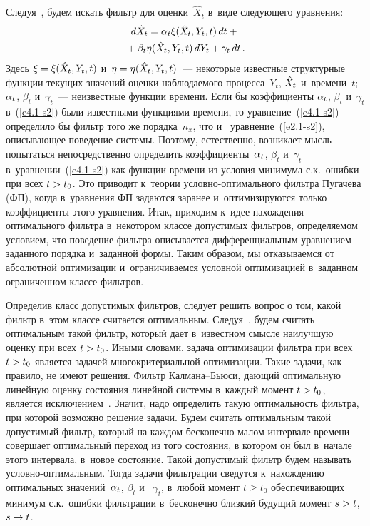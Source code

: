 \begin{multicols}{2}
Следуя~\cite{3-s2, 1-s2}, будем искать фильтр для оценки~$\hat X_t$ в~виде 
следующего уравнения:
 \begin{multline}
 d\hat X_t =\alpha_t \xi ({\hat X}_t,Y_t, t)\, dt + {}\\
 {}+\beta_t\eta ({\hat X}_t,Y_t, t)\, dY_t +
    \gamma_t \,dt\,.
    \label{e4.1-s2}
    \end{multline}
Здесь  $\xi =\xi ({\hat X}_t,Y_t, t)$ и~$\eta\hm=\eta\yhxt$~--- некоторые известные 
структурные функции
текущих значений оценки наблюдаемого процесса~$Y_t$, $\hat X_t$ и~времени~$t$; 
$\alpha_t$, $\beta_t$ и~$\gamma_t$~--- неизвестные функции времени.
Если бы коэффициенты  $\alpha_t$, $\beta_t$ и~$\gamma_t$ в~(\ref{e4.1-s2})
были известными функциями времени, то уравнение~(\ref{e4.1-s2}) определило
бы фильтр того же  порядка~${n_x}$, что и~ уравнение~(\ref{e2.1-s2}), 
описывающее поведение системы. Поэтому, естественно,
возникает мысль попытаться непосредственно определить коэффициенты~$\alpha_t$, 
$\beta_t$ и~$\gamma_t$ в~уравнении~(\ref{e4.1-s2}) как функции
времени из условия минимума с.к.\ ошибки  при всех  $t\hm>t_0$. Это приводит к~теории
услов\-но-оп\-ти\-маль\-но\-го фильтра Пугачева (ФП), когда в~уравнения
ФП задаются заранее и~оптимизируются только коэффициенты этого уравнения.
Итак, приходим к~идее на\-хож\-де\-ния оптимального фильтра
в~некотором классе допустимых фильтров,
определяемом условием, что поведение фильтра описывается
дифференциальным уравнением заданного порядка и~заданной формы.
Таким образом, мы отказываемся от абсолютной оптимизации 
и~ограничиваемся условной оптимизацией в~заданном ограниченном классе фильтров.

Определив класс допустимых фильтров, следует решить вопрос о том,
какой фильтр в~этом классе считается оптимальным. Следуя~\cite{3-s2}, 
будем считать оптимальным такой фильтр, который дает 
в~известном смысле наилучшую оценку при всех $t\hm>t_0$. Иными словами, 
задача оптимизации фильтра при всех
$t\hm>t_0$ является  задачей многокритериальной оптимизации. Такие
задачи, как правило, не имеют решения. Фильтр Кал\-ма\-на--Бью\-си, да\-ющий
оптимальную линейную оценку состояния линейной системы в~каждый
момент $t\hm>t_0$, является исключением~\cite{3-s2}. Значит, надо
определить такую оптимальность фильтра, при которой возможно решение
задачи. Будем считать оптимальным
такой допустимый фильтр, который на каждом бесконечно малом
интервале времени совершает оптимальный переход из того состояния,
в котором он был в~начале этого интервала, в~новое состояние.
Такой допустимый фильтр будем называть услов\-но-оп\-ти\-маль\-ным. 
Тогда задачи фильтрации сведутся к~нахождению оптимальных значений~$\alpha_t$, 
$\beta_t$ и~ $\gamma_t$, в~любой момент  $t\ge t_0$ обеспечивающих минимум
с.к.\ ошибки фильтрации в~бесконечно близкий будущий момент  $s\hm> t$, $s\hm\to t$.


\end{multicols}

